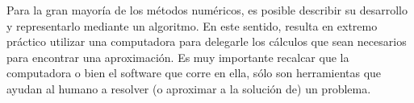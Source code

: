 Para la gran mayoría de los métodos numéricos, es posible describir su desarrollo y representarlo mediante un algoritmo. En este sentido, 
resulta en extremo práctico utilizar una computadora para delegarle los cálculos que sean necesarios para encontrar una aproximación. 
Es muy importante recalcar que la computadora o bien el software que corre en ella, sólo son herramientas que ayudan al humano a resolver 
(o aproximar a la solución de) un problema.